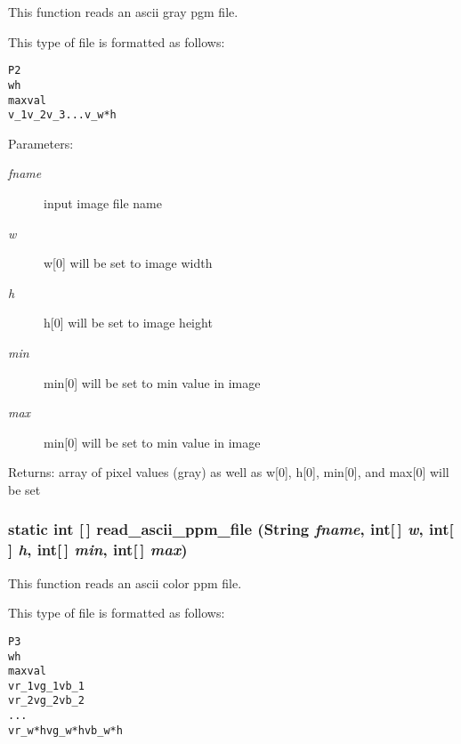 This function reads an ascii gray pgm file. 

This type of file is formatted as follows: \small\begin{alltt}
    P2
    w h
    maxval
    v\_1 v\_2 v\_3 . . . v\_w*h
  \end{alltt}\normalsize 


\begin{Desc}
\item[Parameters:]
\begin{description}
\item[{\em fname}]input image file name \item[{\em w}]w[0] will be set to image width \item[{\em h}]h[0] will be set to image height \item[{\em min}]min[0] will be set to min value in image \item[{\em max}]min[0] will be set to min value in image\end{description}
\end{Desc}
\begin{Desc}
\item[Returns:]array of pixel values (gray) as well as w[0], h[0], min[0], and max[0] will be set \end{Desc}
\subsubsection{\setlength{\rightskip}{0pt plus 5cm}static int [$\,$] read\_\-ascii\_\-ppm\_\-file (String {\em fname}, int[$\,$] {\em w}, int[$\,$] {\em h}, int[$\,$] {\em min}, int[$\,$] {\em max})\hspace{0.3cm}{\tt  [static, protected]}}\label{class_c_s_image_viewer_1_1pnm_helper_d720e5b006c12f016e792ac0c70ba806}


This function reads an ascii color ppm file. 

This type of file is formatted as follows: \small\begin{alltt}
    P3
    w h
    maxval
    vr\_1 vg\_1 vb\_1
    vr\_2 vg\_2 vb\_2
    . . .
    vr\_w*h vg\_w*h vb\_w*h
  \end{alltt}\normalsize 


